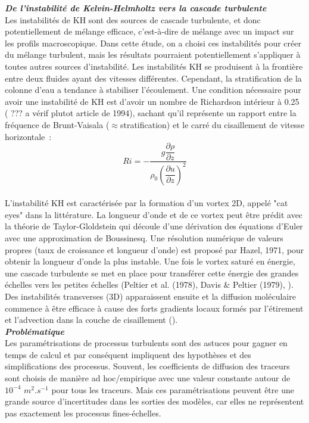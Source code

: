 \documentclass[a4paper,12pt]{article}
\begin{document}
    \newline
    \textbf{\textit{De l'instabilité de Kelvin-Helmholtz vers la cascade turbulente}} \\
    Les instabilités de KH sont des sources de cascade turbulente, et donc potentiellement de mélange efficace, c'est-à-dire de mélange avec un impact sur les profils macroscopique. Dans cette étude, on a choisi ces instabilités pour créer du mélange turbulent, mais les résultats pourraient potentiellement s'appliquer à toutes autres sources d'instabilité. Les instabilités KH se produisent à la frontière entre deux fluides ayant des vitesses différentes. Cependant, la stratification de la colonne d'eau a tendance à stabiliser l'écoulement. Une condition nécessaire pour avoir une instabilité de KH est d'avoir un nombre de Richardson intérieur à 0.25 (\cite{peltier_m_2003} ??? a vérif plutot article de 1994), sachant qu'il représente un rapport entre la fréquence de Brunt-Vaisala ($\approx$stratification) et le carré du cisaillement de vitesse horizontale : \\
    \begin{equation}
        Ri = -\frac{g \dfrac{\partial\rho}{\partial z}}{\rho_0 (\dfrac{\partial u}{\partial z})^2}
        \label{Ri}
    \end{equation}
    \\
    L'instabilité KH est caractérisée par la formation d'un vortex 2D, appelé "cat eyes" dans la littérature. La longueur d'onde et de ce vortex peut être prédit avec la théorie de Taylor-Gloldstein qui découle d'une dérivation des équations d'Euler avec une approximation de Boussinesq. Une résolution numérique de valeurs propres (taux de croissance et longueur d'onde) est proposé par Hazel, 1971, pour obtenir la longueur d'onde la plus instable. Une fois le vortex saturé en énergie, une cascade turbulente se met en place pour transférer cette énergie des grandes échelles vers les petites échelles (Peltier et al. (1978), Davis \& Peltier (1979), \cite{klaassen_onset_1985} \cite{klaassen_role_1989}). Des instabilités transverses (3D) apparaissent ensuite et la diffusion moléculaire commence à être efficace à cause des forts gradients locaux formés par l'étirement et l'advection dans la couche de cisaillement (\cite{caulfield_three_1994}).  \\
    \newline
    \textbf{\textit{Problématique}} \\
    Les paramétrisations de processus turbulents sont des astuces pour gagner en temps de calcul et par conséquent impliquent des hypothèses et des simplifications des processus. Souvent, les coefficients de diffusion des traceurs sont choisis de manière ad hoc/empirique avec une valeur constante autour de $10^{-4}$ $m^2.s^{-1}$ pour tous les traceurs. Mais ces paramétrisations peuvent être une grande source d'incertitudes dans les sorties des modèles, car elles ne représentent pas exactement les processus fines-échelles. 
\end{document}
